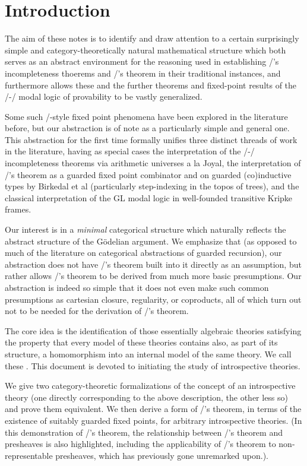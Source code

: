 \filestart

\section{Introduction}
The aim of these notes is to identify and draw attention to a certain surprisingly simple and category-theoretically natural mathematical structure which both serves as an abstract environment for the reasoning used in establishing \Goedel/'s incompleteness thoerems and \Loeb/'s theorem in their traditional instances, and furthermore allows these and the further theorems and fixed-point results of the \Goedel/-\Loeb/ modal logic of provability to be vastly generalized.

Some such \Loeb/-style fixed point phenomena have been explored in the literature before, but our abstraction is of note as a particularly simple and general one. This abstraction for the first time formally unifies three distinct threads of work in the literature, having as special cases the interpretation of the \Goedel/-\Loeb/ incompleteness theorems via arithmetic universes a la Joyal, the interpretation of \Loeb/'s theorem as a guarded fixed point combinator and on guarded (co)inductive types by Birkedal et al (particularly step-indexing in the topos of trees), and the classical interpretation of the GL modal logic in well-founded transitive Kripke frames.

Our interest is in a \emph{minimal} categorical structure which naturally reflects the abstract structure of the G\"odelian argument. We emphasize that (as opposed to much of the literature on categorical abstractions of guarded recursion), our abstraction does not have \Loeb/'s theorem built into it directly as an assumption, but rather allows \Loeb/'s theorem to be derived from much more basic presumptions. Our abstraction is indeed so simple that it does not even make such common presumptions as cartesian closure, regularity, or coproducts, all of which turn out not to be needed for the derivation of \Loeb/'s theorem.

The core idea is the identification of those essentially algebraic theories satisfying the property that every model of these theories contains also, as part of its structure, a homomorphism into an internal model of the same theory. We call these . This document is devoted to initiating the study of introspective theories.

We give two category-theoretic formalizations of the concept of an introspective theory (one directly corresponding to the above description, the other less so) and prove them equivalent. We then derive a form of \Loeb/'s theorem, in terms of the existence of suitably guarded fixed points, for arbitrary introspective theories. (In this demonstration of \Loeb/'s theorem, the relationship between \Loeb/'s theorem and presheaves is also highlighted, including the applicability of \Loeb/'s theorem to non-representable presheaves, which has previously gone unremarked upon.).

